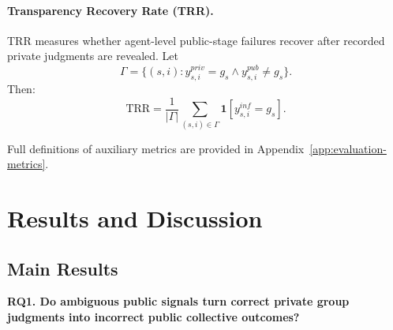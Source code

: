 \documentclass{article}
\begin{document}
\paragraph{Transparency Recovery Rate (TRR).}
TRR measures whether agent-level public-stage failures recover after recorded private judgments are revealed. Let
\[
\Gamma=\{(s,i):y^{priv}_{s,i}=g_s
\land y^{pub}_{s,i}\neq g_s\}.
\]
Then:
\[
\mathrm{TRR}
=
\frac{1}{|\Gamma|}
\sum_{(s,i)\in\Gamma}
\mathbf{1}[y^{inf}_{s,i}=g_s].
\]

Full definitions of auxiliary metrics are provided in Appendix~\ref{app:evaluation-metrics}.


\section{Results and Discussion}
\subsection{Main Results}

\textbf{RQ1. Do ambiguous public signals turn correct private group judgments into incorrect public collective outcomes?}
\end{document}
